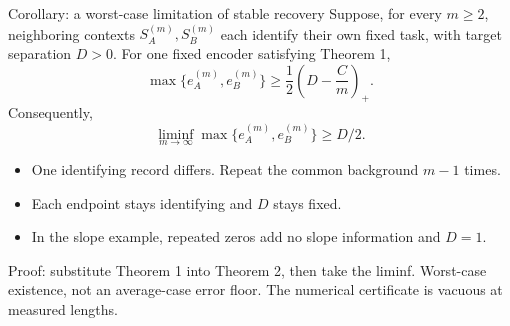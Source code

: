 \documentclass[aspectratio=169,11pt]{beamer}
\newcommand{\source}[1]{\par\vfill{\color{muted}\tiny #1}}
\begin{document}
\begin{frame}{Corollary: a worst-case limitation of stable recovery}
\small
Suppose, for every \(m\ge2\), neighboring contexts \(S_A^{(m)},S_B^{(m)}\)
each identify their own fixed task, with target separation \(D>0\).
For one fixed encoder satisfying Theorem 1,
\[
\boxed{\max\{e_A^{(m)},e_B^{(m)}\}
\ge \frac12\left(D-\frac Cm\right)_+.}
\]
Consequently,
\[
\boxed{\liminf_{m\to\infty}
\max\{e_A^{(m)},e_B^{(m)}\}\ge D/2.}
\]
\begin{itemize}
\setlength{\itemsep}{1.5mm}
\item One identifying record differs. Repeat the common background \(m-1\) times.
\item Each endpoint stays identifying and \(D\) stays fixed.
\item In the slope example, repeated zeros add no slope information and \(D=1\).
\end{itemize}
\source{Proof: substitute Theorem 1 into Theorem 2, then take the liminf.
Worst-case existence, not an average-case error floor.
The numerical certificate is vacuous at measured lengths.}
\end{frame}
\end{document}
